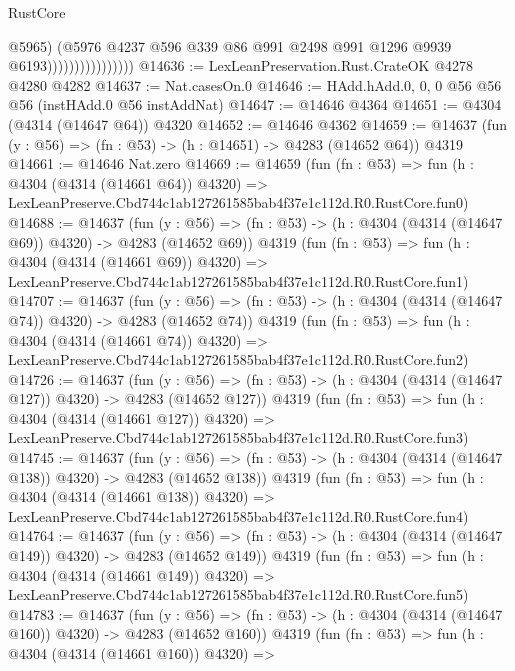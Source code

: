\begin{lexlean}{RustCore}
\begin{coremodule}
                                    @5965)
                                  (@5976
                                    @4237
                                    @596
                                    @339
                                    @86
                                    @991
                                    @2498
                                    @991
                                    @1296
                                    @9939
                                    @6193))))))))))))))))
@14636 := LexLeanPreservation.Rust.CrateOK @4278 @4280 @4282
@14637 := Nat.casesOn.{0}
@14646 := HAdd.hAdd.{0, 0, 0} @56 @56 @56 (instHAdd.{0} @56 instAddNat)
@14647 := @14646 @4364
@14651 := @4304 (@4314 (@14647 @64)) @4320
@14652 := @14646 @4362
@14659 := @14637 (fun (y : @56) => (fn : @53) -> (h : @14651) -> @4283 (@14652 @64)) @4319
@14661 := @14646 Nat.zero
@14669 := @14659
    (fun (fn : @53) =>
    fun (h : @4304 (@4314 (@14661 @64)) @4320) =>
    LexLeanPreserve.Cbd744c1ab127261585bab4f37e1c112d.R0.RustCore.fun0)
@14688 := @14637
    (fun (y : @56) => (fn : @53) -> (h : @4304 (@4314 (@14647 @69)) @4320) -> @4283 (@14652 @69))
    @4319
    (fun (fn : @53) =>
    fun (h : @4304 (@4314 (@14661 @69)) @4320) =>
    LexLeanPreserve.Cbd744c1ab127261585bab4f37e1c112d.R0.RustCore.fun1)
@14707 := @14637
    (fun (y : @56) => (fn : @53) -> (h : @4304 (@4314 (@14647 @74)) @4320) -> @4283 (@14652 @74))
    @4319
    (fun (fn : @53) =>
    fun (h : @4304 (@4314 (@14661 @74)) @4320) =>
    LexLeanPreserve.Cbd744c1ab127261585bab4f37e1c112d.R0.RustCore.fun2)
@14726 := @14637
    (fun (y : @56) => (fn : @53) -> (h : @4304 (@4314 (@14647 @127)) @4320) -> @4283 (@14652 @127))
    @4319
    (fun (fn : @53) =>
    fun (h : @4304 (@4314 (@14661 @127)) @4320) =>
    LexLeanPreserve.Cbd744c1ab127261585bab4f37e1c112d.R0.RustCore.fun3)
@14745 := @14637
    (fun (y : @56) => (fn : @53) -> (h : @4304 (@4314 (@14647 @138)) @4320) -> @4283 (@14652 @138))
    @4319
    (fun (fn : @53) =>
    fun (h : @4304 (@4314 (@14661 @138)) @4320) =>
    LexLeanPreserve.Cbd744c1ab127261585bab4f37e1c112d.R0.RustCore.fun4)
@14764 := @14637
    (fun (y : @56) => (fn : @53) -> (h : @4304 (@4314 (@14647 @149)) @4320) -> @4283 (@14652 @149))
    @4319
    (fun (fn : @53) =>
    fun (h : @4304 (@4314 (@14661 @149)) @4320) =>
    LexLeanPreserve.Cbd744c1ab127261585bab4f37e1c112d.R0.RustCore.fun5)
@14783 := @14637
    (fun (y : @56) => (fn : @53) -> (h : @4304 (@4314 (@14647 @160)) @4320) -> @4283 (@14652 @160))
    @4319
    (fun (fn : @53) =>
    fun (h : @4304 (@4314 (@14661 @160)) @4320) =>

\end{coremodule}
\end{lexlean}
